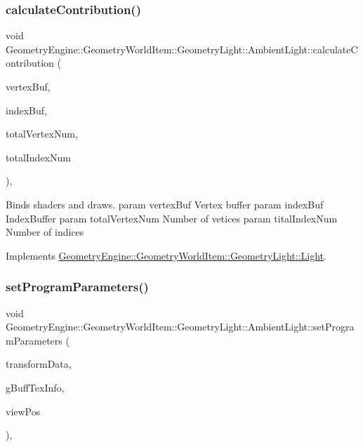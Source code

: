 \subsubsection{\texorpdfstring{calculateContribution()}{calculateContribution()}}
{\footnotesize\ttfamily void Geometry\+Engine\+::\+Geometry\+World\+Item\+::\+Geometry\+Light\+::\+Ambient\+Light\+::calculate\+Contribution (\begin{DoxyParamCaption}\item[{Q\+Open\+G\+L\+Buffer $\ast$}]{vertex\+Buf,  }\item[{Q\+Open\+G\+L\+Buffer $\ast$}]{index\+Buf,  }\item[{unsigned int}]{total\+Vertex\+Num,  }\item[{unsigned int}]{total\+Index\+Num }\end{DoxyParamCaption})\hspace{0.3cm}{\ttfamily [protected]}, {\ttfamily [virtual]}}

Binds shaders and draws. param vertex\+Buf Vertex buffer param index\+Buf Index\+Buffer param total\+Vertex\+Num Number of vetices param tital\+Index\+Num Number of indices 

Implements \mbox{\hyperlink{class_geometry_engine_1_1_geometry_world_item_1_1_geometry_light_1_1_light_a58aa2a3520f7aa2b03afcb4123e7530a}{Geometry\+Engine\+::\+Geometry\+World\+Item\+::\+Geometry\+Light\+::\+Light}}.

\mbox{\label{class_geometry_engine_1_1_geometry_world_item_1_1_geometry_light_1_1_ambient_light_a37469f72317d3d9cd0e5fb46fbf5fedf}} 
\subsubsection{\texorpdfstring{setProgramParameters()}{setProgramParameters()}}
{\footnotesize\ttfamily void Geometry\+Engine\+::\+Geometry\+World\+Item\+::\+Geometry\+Light\+::\+Ambient\+Light\+::set\+Program\+Parameters (\begin{DoxyParamCaption}\item[{const \mbox{\hyperlink{struct_geometry_engine_1_1_lighting_transformation_data}{Lighting\+Transformation\+Data}} \&}]{transform\+Data,  }\item[{const \mbox{\hyperlink{struct_geometry_engine_1_1_g_buffer_texture_info}{G\+Buffer\+Texture\+Info}} \&}]{g\+Buff\+Tex\+Info,  }\item[{const Q\+Vector3D \&}]{view\+Pos }\end{DoxyParamCaption})\hspace{0.3cm}{\ttfamily [protected]}, {\ttfamily [virtual]}}

